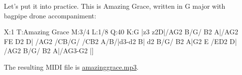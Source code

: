 \documentclass[a4paper,12pt]{book}
\begin{document}
Let's put it into practice. This is Amazing Grace, written in G major with
bagpipe drone accompaniment:

\begin{abcsource}
X:1
T:Amazing Grace
M:3/4
L:1/8
Q:40
K:G
|z3 z2D|{/A}G2 B/G/ B2 A|{/A}G2 {F}E D2 D|
{/A}G2 {/C}B/G/ {/C}B2 A/B/|d3-d2 B|
d2 B/G/ B2 A|G2 E {/E}D2 D|
{/A}G2 B/G/ B2 A|{/A}G3-G2 |]
\end{abcsource}

The resulting MIDI file is \href{run:amazinggrace.mp3}{amazinggrace.mp3}.










\end{document}
